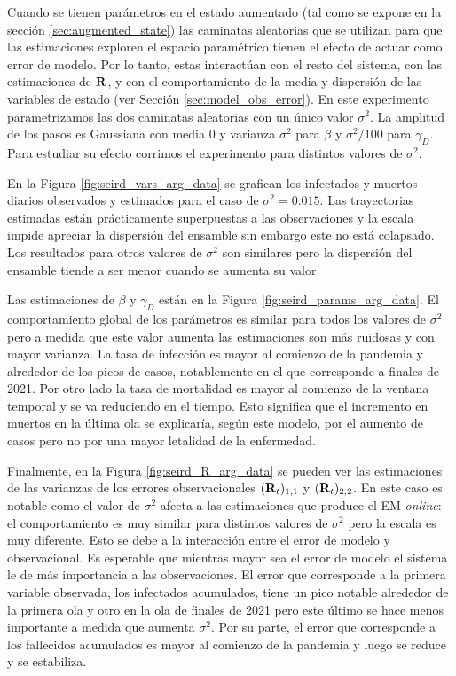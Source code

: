 Cuando se tienen parámetros en el estado aumentado (tal como se expone en la sección \ref{sec:augmented_state}) las caminatas aleatorias que se utilizan para que las estimaciones exploren el espacio paramétrico tienen el efecto de actuar como error de modelo. Por lo tanto, estas interactúan con el resto del sistema, con las estimaciones de $\mathbf{R}$, y con el comportamiento de la media y dispersión de las variables de estado (ver Sección \ref{sec:model_obs_error}). En este experimento parametrizamos las dos caminatas aleatorias con un único valor $\sigma^2$. La amplitud de los pasos es Gaussiana con media 0 y varianza $\sigma^2$ para $\beta$ y $\sigma^2/100$ para $\gamma_D$. Para estudiar su efecto corrimos el experimento para distintos valores de $\sigma^2$. 

En la Figura \ref{fig:seird_vars_arg_data} se grafican los infectados y muertos diarios observados y estimados para el caso de $\sigma^2 = 0.015$. Las trayectorias estimadas están prácticamente superpuestas a las observaciones y la escala impide apreciar la dispersión del ensamble sin embargo este no está colapsado. Los resultados para otros valores de $\sigma^2$ son similares pero la dispersión del ensamble tiende a ser menor cuando se aumenta su valor.

Las estimaciones de $\beta$ y $\gamma_D$ están en la Figura \ref{fig:seird_params_arg_data}. El comportamiento global de los parámetros es similar para todos los valores de $\sigma^2$ pero a medida que este valor aumenta las estimaciones son más ruidosas y con mayor varianza.
La tasa de infección es mayor al comienzo de la pandemia y alrededor de los picos de casos, notablemente en el que corresponde a finales de 2021. Por otro lado la tasa de mortalidad es mayor al comienzo de la ventana temporal y se va reduciendo en el tiempo. Esto significa que el incremento en muertos en la última ola se explicaría, según este modelo, por el aumento de casos pero no por una mayor letalidad de la enfermedad.

Finalmente, en la Figura \ref{fig:seird_R_arg_data} se pueden ver las estimaciones de las varianzas de los errores observacionales $(\mathbf{R}_t)_{1,1}$ y $(\mathbf{R}_t)_{2, 2}$. En este caso es notable como el valor de $\sigma^2$ afecta a las estimaciones que produce el EM \textit{online}: el comportamiento es muy similar para distintos valores de $\sigma^2$ pero la escala es muy diferente. Esto se debe a la interacción entre el error de modelo y observacional. Es esperable que mientras mayor sea el error de modelo el sistema le de más importancia a las observaciones. El error que corresponde a la primera variable observada, los infectados acumulados, tiene un pico notable alrededor de la primera ola y otro en la ola de finales de 2021 pero este último se hace menos importante a medida que aumenta $\sigma^2$. Por su parte, el error que corresponde a los fallecidos acumulados es mayor al comienzo de la pandemia y luego se reduce y se estabiliza.

